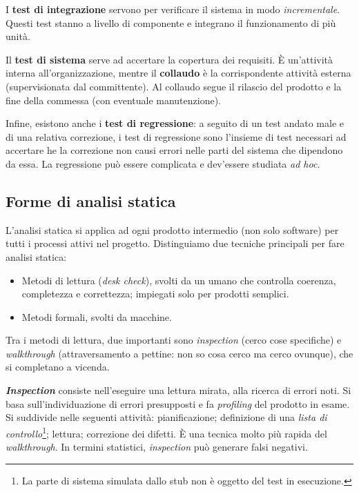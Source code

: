 \documentclass[a4paper]{article}
\begin{document}
I \textbf{test di integrazione} servono per verificare il sistema in modo \emph{incrementale}. Questi test stanno a livello di componente e integrano il funzionamento di più unità.
		
Il \textbf{test di sistema} serve ad accertare la copertura dei requisiti. È un'attività interna all'organizzazione, mentre il \textbf{collaudo} è la corrispondente attività esterna (supervisionata dal committente). Al collaudo segue il rilascio del prodotto e la fine della commessa (con eventuale manutenzione).
		
Infine, esistono anche i \textbf{test di regressione}: a seguito di un test andato male e di una relativa correzione, i test di regressione sono l'insieme di test necessari ad accertare he la correzione non causi errori nelle parti del sistema che dipendono da essa. La regressione può essere complicata e dev'essere studiata \emph{ad hoc}.

		
	\subsection{Forme di analisi statica}

		
L'analisi statica si applica ad ogni prodotto intermedio (non solo software) per tutti i processi attivi nel progetto. Distinguiamo due tecniche principali per fare analisi statica:
		
	\begin{itemize}
		
			
	\item Metodi di lettura (\emph{desk check}), svolti da un umano che controlla coerenza, completezza e correttezza; impiegati solo per prodotti semplici.
			
	\item Metodi formali, svolti da macchine.
		
	\end{itemize}

		
Tra i metodi di lettura, due importanti sono \emph{inspection} (cerco cose specifiche) e \emph{walkthrough} (attraversamento a pettine: non so cosa cerco ma cerco ovunque), che si completano a vicenda.
		
\textbf{\emph{Inspection}} consiste nell'eseguire una lettura mirata, alla ricerca di errori noti. Si basa sull'individuazione di errori presupposti e fa \emph{profiling} del prodotto in esame. Si suddivide nelle seguenti attività: pianificazione; definizione di una \emph{lista di controllo}\footnote{La parte di sistema simulata dallo stub non è oggetto del test in esecuzione.}; lettura; correzione dei difetti. È una tecnica molto più rapida del \emph{walkthrough}. In termini statistici, \emph{inspection} può generare falsi negativi.
		
\end{document}
